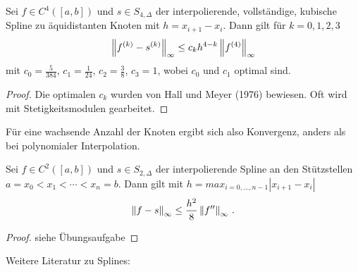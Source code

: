 \begin{Satze}\label{5.2.21}
  Sei $f\in C^4([a,b])$ und $s\in S_{4,\Delta}$ 
  der interpolierende, vollständige, kubische Spline 
  zu äquidistanten Knoten mit $h=x_{i+1}-x_i$. Dann gilt
  für $k=0,1,2,3$
  \begin{gather*}
    \nn[f^{(k)}-s^{(k)}]_{\infty}\leq c_kh^{4-k}\nn[f^{(4)}]_{\infty}
  \end{gather*}
  mit $c_0=\frac{5}{384}$, $c_1=\frac{1}{24}$, $c_2=\frac{3}{8}$,
  $c_3=1$, wobei $c_0$ und $c_1$ optimal sind.

  \begin{proof}
    \cite[siehe z.B.]
    [(in allgemeiner Form, d.h. auch für nicht gleichmäßiges Gitter)]
    {stoerbulirsch}
    Die optimalen $c_k$ wurden von Hall und Meyer (1976) bewiesen.
    Oft wird mit Stetigkeitsmodulen gearbeitet.
  \end{proof}
\end{Satze}


Für eine wachsende Anzahl der Knoten ergibt sich also Konvergenz,
anders als bei polynomialer Interpolation.


\begin{Satze}\label{6.2.22}
  Sei $f\in C^2([a,b])$ und $s\in S_{2,\Delta}$
  der interpolierende Spline  an den Stützstellen 
  $a=x_0<x_1<\dotsb<x_n=b$. 
  Dann gilt mit $h=max_{i=0,\dotsc,n-1}|x_{i+1}-x_i|$
  \begin{gather*}
    \nn[f-s]_{\infty}\leq \frac{h^2}{8}\nn[f'']_{\infty} \, .
  \end{gather*}

  \begin{proof} 
    siehe Übungsaufgabe
  \end{proof}
\end{Satze}


Weitere Literatur zu
Splines: \cite{boor}

